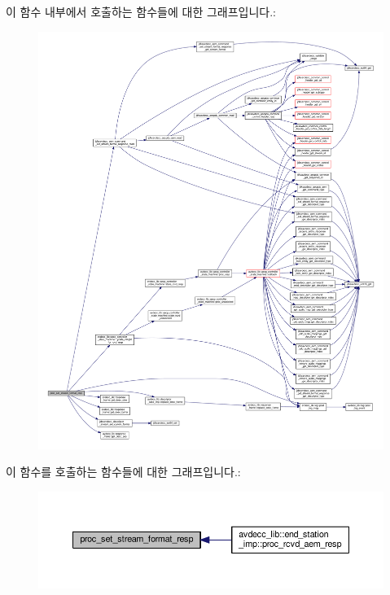 이 함수 내부에서 호출하는 함수들에 대한 그래프입니다.\+:
\nopagebreak
\begin{figure}[H]
\begin{center}
\leavevmode
\includegraphics[width=350pt]{classavdecc__lib_1_1stream__input__descriptor__imp_af496c7db35b10428eb3587c7f460297a_cgraph}
\end{center}
\end{figure}




이 함수를 호출하는 함수들에 대한 그래프입니다.\+:
\nopagebreak
\begin{figure}[H]
\begin{center}
\leavevmode
\includegraphics[width=350pt]{classavdecc__lib_1_1stream__input__descriptor__imp_af496c7db35b10428eb3587c7f460297a_icgraph}
\end{center}
\end{figure}


